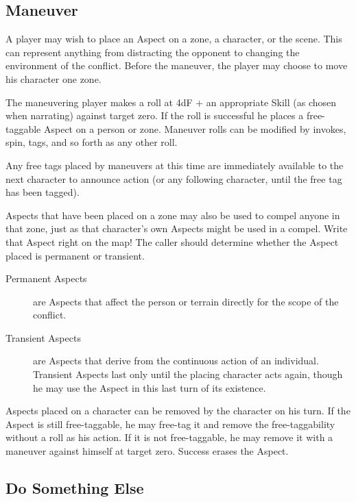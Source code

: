 
\subsection{Maneuver}\label{sec:personal-combat-maneuver}

A player may wish to place an Aspect on a zone, a character, or the scene. This can represent anything from distracting the opponent to changing the environment of the conflict.  Before the maneuver, the player may choose to move his character one zone.

The maneuvering player makes a roll at 4dF + an appropriate Skill (as chosen when narrating) against target zero. If the roll is successful he places a free-taggable Aspect on a person or zone. Maneuver rolls can be modified by invokes, spin, tags, and so forth as any other roll.

Any free tags placed by maneuvers at this time are immediately available to the next character to announce action (or any following character, until the free tag has been tagged).

Aspects that have been placed on a zone may also be used to compel anyone in that zone, just as that character's own Aspects might be used in a compel. Write that Aspect right on the map! The caller should determine whether the Aspect placed is permanent or transient.


\begin{description}
\item[Permanent Aspects]
are Aspects that affect the person or terrain directly for the scope of the conflict.
\item[Transient Aspects]
are Aspects that derive from the continuous action of an individual. Transient Aspects last only until the placing character acts again, though he may use the Aspect in this last turn of its existence.
\end{description}

Aspects placed on a character can be removed by the character on his turn. If the Aspect is still free-taggable, he may free-tag it and remove the free-taggability without a roll as his action. If it is not free-taggable, he may remove it with a maneuver against himself at target zero. Success erases the Aspect.


\subsection{Do Something Else}\label{sec:personal-combat-do-something-else}

